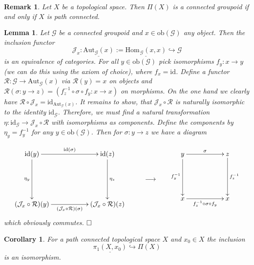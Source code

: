 \documentclass[11pt]{book}
\numberwithin{dummy}{section}
\newtheorem{lemma}[theorem]{Lemma}
\newtheorem{corollary}[theorem]{Corollary}
\newtheorem{remark}[theorem]{Remark}
\theoremstyle{nonumberbreak}
\newenvironment{pr}[1][]{\ifthenelse{\equal{#1}{}}{\proof}{\proof[#1]}\rm}{\endproof}
\newcommand{\Hom}{\mathrm{Hom}\hspace{1pt}}
\newcommand{\G}{\mathcal{G}}
\newcommand{\R}{\mathcal{R}}
\newcommand{\la}{\longrightarrow}
\newcommand{\id}{\mathrm{id}}
\begin{document}
\begin{spacing}{1.4}
\begin{remark}
Let $X$ be a topological space. Then $\Pi(X)$ is a connected groupoid if and only if $X$ is path connected.
\end{remark}

\begin{lemma}
Let $\G$ be a connected groupoid and $x \in \mathrm{ob}(\G)$ any object. Then the inclusion functor
$$\mathcal{J}_x: \underline{\mathrm{Aut}_{\G}(x)} := \underline{\Hom_{\G}(x,x)} \hookrightarrow \G$$
is an equivalence of categories.
\begin{pr}
For all $y \in \mathrm{ob}(\G)$ pick isomorphisms $f_y: x \la y$ (we can do this using the axiom of choice), where $f_x = \id$. Define a functor $\R: \G \la \mathrm{Aut}_{\G}(x)$ via $\R(y)=x$ on objects and $\R(\sigma: y \la z) = (f_z^{-1} \circ \sigma \circ f_y: x \la x)$ on morphisms. On the one hand we clearly have $\R \circ \mathcal{J}_x = \id_{\mathrm{Aut}_{\G}(x)}$. It remains to show, that $\mathcal{J}_x \circ \R$ is naturally isomorphic to the identity $\id_{\G}$. Therefore, we must find a natural transformation $\eta: \id_{\G} \la \mathcal{J}_x \circ \R$ with isomorphisms as components. Define the components by $\eta_y = f_y^{-1}$ for any $y \in \mathrm{ob}(\G)$. Then for $\sigma: y \la z$ we have a diagram

$$
\begin{xy}
\xymatrix{
\id(y) \ar[rr]^{\id(\sigma)} \ar[dd]_{\eta_y} && \id(z) \ar[dd]^{\eta_z}& \\ &&& \la  \\ (\mathcal{J}_x \circ \R)(y) \ar[rr]_{(\mathcal{J}_x \circ \R)(\sigma)} && (\mathcal{J}_x \circ \R)(z)&
}
\end{xy}
\begin{xy}
\xymatrix{
&y \ar[dd]_{f_y^{-1}} \ar[rr]^{\sigma} && z \ar[dd]^{f_z^{-1}} \\&&&\\ &x \ar[rr]_{f_z^{-1} \circ \sigma \circ f_y} && x
}
\end{xy}
$$
which obviously commutes. $\hfill \Box$
\end{pr}

\end{lemma}



\begin{corollary}
For a path connected topological space $X$ and $x_0 \in X$ the inclusion 
$$\underline{\pi_1(X,x_0)} \hookrightarrow \Pi(X)$$
is an isomorphism.
\end{corollary}


\end{spacing}
\end{document}
